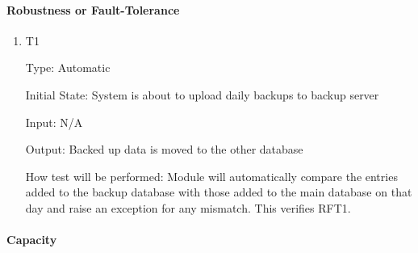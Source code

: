 \documentclass[12pt, titlepage]{article}
\begin{document}
\paragraph{Robustness or Fault-Tolerance}

\begin{enumerate}

\item{T1\\}
\hypertarget{NFR12.4-TC1}{}

Type: Automatic

Initial State: System is about to upload daily backups to backup server

Input: N/A

Output: Backed up data is moved to the other database

How test will be performed: Module will automatically compare the entries added to the backup database with those added to the main database on that day and raise an exception for any mismatch. This verifies RFT1.

\end{enumerate}

\paragraph{Capacity}
\end{document}
